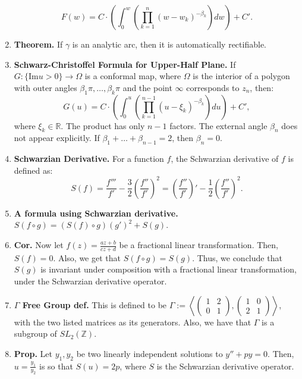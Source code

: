 \begin{enumerate}
	$$
	F(w) = C \cdot \left(\int_{0}^{w} \left(\prod_{k=1}^{n} (w-w_k)^{-\beta_k}\right) dw \right) + C'. 
	$$
	\item \textbf{Theorem. } If $\gamma$ is an analytic arc, then it is automatically rectifiable. 
	\item \textbf{Schwarz-Christoffel Formula for Upper-Half Plane. } If $G: \{\textrm{Im} u > 0\} \to \Omega$ is a conformal map, where $\Omega$ is the interior of a polygon with outer angles $\beta_1\pi,\dots,\beta_k\pi$ and the point $\infty$ corresponds to $z_n$, then: 
	$$
	G(u) = C \cdot \left(\int_{0}^{u} \left(\prod_{k=1}^{n-1} (u - \xi_k)^{-\beta_k}\right) du \right) + C', 
	$$
	where $\xi_k \in \mathbb{R}$. The product has only $n-1$ factors. The external angle $\beta_n$ does not appear explicitly. If $\beta_1 + \dots + \beta_{n-1}=2$, then $\beta_n = 0$. 
	\item \textbf{Schwarzian Derivative. } For a function $f$, the Schwarzian derivative of $f$ is defined as: 
	$$
	S(f) = \frac{f'''}{f'} - \frac{3}{2}\left(\frac{f''}{f'}\right)^2 = \left(\frac{f''}{f'}\right)' - \frac{1}{2}\left(\frac{f''}{f'}\right)^2. 
	$$
	\item \textbf{A formula using Schwarzian derivative. } $S(f \circ g) = (S(f) \circ g)(g')^2 + S(g)$. 
	\item \textbf{Cor. } Now let $f(z) = \frac{az+b}{cz+d}$ be a fractional linear transformation. Then, $S(f)=0$. Also, we get that $S(f \circ g) = S(g)$. Thus, we conclude that $S(g)$ is invariant under composition with a fractional linear transformation, under the Schwarzian derivative operator. 
	\item \textbf{$\Gamma$ Free Group def. } This is defined to be $\Gamma := \left\langle \begin{pmatrix} 1 & 2 \\ 0 & 1\end{pmatrix}, \begin{pmatrix} 1 & 0 \\ 2 & 1 \end{pmatrix}\right\rangle$, with the two listed matrices as its generators. Also, we have that $\Gamma$ is a subgroup of $SL_2(\mathbb{Z})$. 
	\item \textbf{Prop. } Let $y_1,y_2$ be two linearly independent solutions to $y'' + py=0$. Then, $u = \frac{y_1}{y_2}$ is so that $S(u)=2p$, where $S$ is the Schwarzian derivative operator. 
\end{enumerate}  
 

